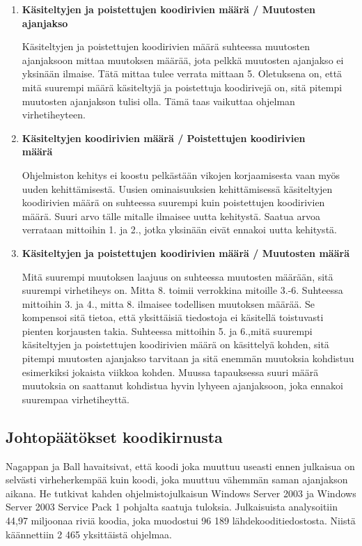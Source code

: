 \documentclass[finnish]{../tktltiki2}
\theoremstyle{definition}
\theoremstyle{remark}
\begin{document}
\begin{enumerate}
    \item {\bf Käsiteltyjen ja poistettujen koodirivien määrä / Muutosten ajanjakso}
    
    Käsiteltyjen ja poistettujen koodirivien määrä suhteessa muutosten ajanjaksoon mittaa muutoksen määrää, jota pelkkä 
    muutosten ajanjakso ei yksinään ilmaise. Tätä mittaa tulee verrata mittaan 5. Oletuksena on, että mitä suurempi 
    määrä käsiteltyjä ja poistettuja koodirivejä on, sitä pitempi muutosten ajanjakson tulisi olla. Tämä taas vaikuttaa 
    ohjelman virhetiheyteen.

    \item {\bf Käsiteltyjen koodirivien määrä / Poistettujen koodirivien\\määrä}
    
    Ohjelmiston kehitys ei koostu pelkästään vikojen korjaamisesta vaan myös uuden kehittämisestä. Uusien ominaisuuksien 
    kehittämisessä käsiteltyjen koodirivien määrä on suhteessa suurempi kuin poistettujen koodirivien määrä. Suuri arvo 
    tälle mitalle ilmaisee uutta kehitystä. Saatua arvoa verrataan mittoihin 1. ja 2., jotka yksinään eivät ennakoi 
    uutta kehitystä.

    \item {\bf Käsiteltyjen ja poistettujen koodirivien määrä / Muutosten määrä}
    
    Mitä suurempi muutoksen laajuus on suhteessa muutosten määrään, sitä suurempi virhetiheys on. Mitta 8. toimii
    verrokkina mitoille 3.-6. Suhteessa mittoihin 3. ja 4., mitta 8. ilmaisee todellisen muutoksen määrää. Se kompensoi
    sitä tietoa, että yksittäisiä tiedostoja ei käsitellä toistuvasti pienten korjausten takia. Suhteessa mittoihin 5. 
    ja 6.,mitä suurempi käsiteltyjen ja poistettujen koodirivien määrä on käsittelyä kohden, sitä pitempi muutosten 
    ajanjakso tarvitaan ja sitä enemmän muutoksia kohdistuu esimerkiksi jokaista viikkoa kohden. Muussa tapauksessa 
    suuri määrä muutoksia on saattanut kohdistua hyvin lyhyeen ajanjaksoon, joka ennakoi suurempaa virhetiheyttä.

\end{enumerate}

\subsection{Johtopäätökset koodikirnusta}

Nagappan ja Ball havaitsivat, että koodi joka muuttuu useasti ennen julkaisua on selvästi virheherkempää kuin koodi, 
joka muuttuu vähemmän saman ajanjakson aikana. He tutkivat kahden ohjelmistojulkaisun Windows Server 2003 ja Windows 
Server 2003 Service Pack 1 pohjalta saatuja tuloksia. Julkaisuista analysoitiin 44,97 miljoonaa riviä koodia, joka 
muodostui 96 189 lähdekooditiedostosta. Niistä käännettiin 2 465 yksittäistä ohjelmaa.\newline
\end{document}
